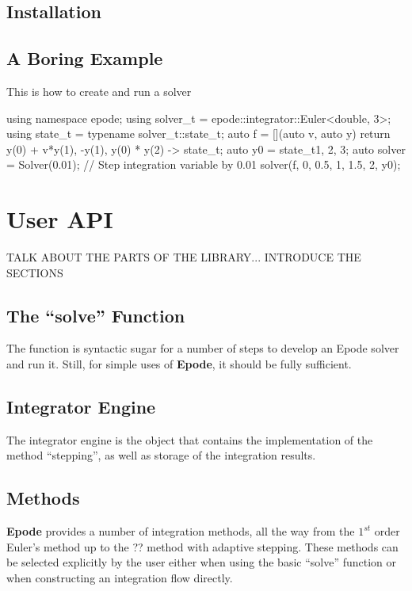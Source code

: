 \documentclass[letterpaper,10pt]{book}
\newcommand{\epode}[0]{\textbf{Epode}}
\begin{document}

    \section{Installation}

    \section{A Boring Example}
  \begin{listing}
    \label{lst:basic}
    \caption{This is how to create and run a solver}  
    \begin{epodecode}
      using namespace epode;
      using solver_t = epode::integrator::Euler<double, 3>;
      using state_t = typename solver_t::state_t;
      auto f = [](auto v, auto y){
	return {
	  y(0) + v*y(1),
	  -y(1),
	  y(0) * y(2)
	}
      } -> state_t;
      auto y0 = state_t{1, 2, 3};
      auto solver = Solver(0.01); // Step integration variable by 0.01
      solver(f, 0, {0.5, 1, 1.5, 2}, y0);    
    \end{epodecode}
  \end{listing}

  \chapter{User API}
    TALK ABOUT THE PARTS OF THE LIBRARY... INTRODUCE THE SECTIONS

    \section{The ``solve'' Function}
      The function  is syntactic sugar for a number of steps to develop an Epode solver and run it.  Still, for simple uses of \epode{}, it should be fully sufficient.
      
    \section{Integrator Engine}
      The integrator engine is the object that contains the implementation of the method ``stepping'', as well as storage of the integration results.
      
    \section{Methods}
      \epode{} provides a number of integration methods, all the way from the $1^{st}$ order Euler's method up to the ?? method with adaptive stepping.  These methods can be selected explicitly by the user either when using the basic ``solve'' function or when constructing an integration flow directly.
      
\end{document}
